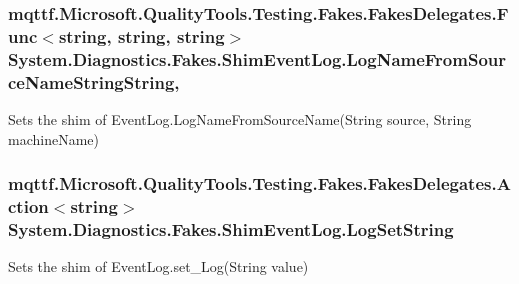 \hypertarget{class_system_1_1_diagnostics_1_1_fakes_1_1_shim_event_log_a5047af2fd0643fda61e2cc93a2b58b8a}{
\subsubsection[{Log\-Name\-From\-Source\-Name\-String\-String}]{\setlength{\rightskip}{0pt plus 5cm}mqttf.\-Microsoft.\-Quality\-Tools.\-Testing.\-Fakes.\-Fakes\-Delegates.\-Func$<$string, string, string$>$ System.\-Diagnostics.\-Fakes.\-Shim\-Event\-Log.\-Log\-Name\-From\-Source\-Name\-String\-String\hspace{0.3cm}{\ttfamily [static]}, {\ttfamily [set]}}}\label{class_system_1_1_diagnostics_1_1_fakes_1_1_shim_event_log_a5047af2fd0643fda61e2cc93a2b58b8a}


Sets the shim of Event\-Log.\-Log\-Name\-From\-Source\-Name(\-String source, String machine\-Name)

\hypertarget{class_system_1_1_diagnostics_1_1_fakes_1_1_shim_event_log_acc996d27a6b101e2035e357da1266cc0}{
\subsubsection[{Log\-Set\-String}]{\setlength{\rightskip}{0pt plus 5cm}mqttf.\-Microsoft.\-Quality\-Tools.\-Testing.\-Fakes.\-Fakes\-Delegates.\-Action$<$string$>$ System.\-Diagnostics.\-Fakes.\-Shim\-Event\-Log.\-Log\-Set\-String\hspace{0.3cm}{\ttfamily [set]}}}\label{class_system_1_1_diagnostics_1_1_fakes_1_1_shim_event_log_acc996d27a6b101e2035e357da1266cc0}


Sets the shim of Event\-Log.\-set\-\_\-\-Log(\-String value)

